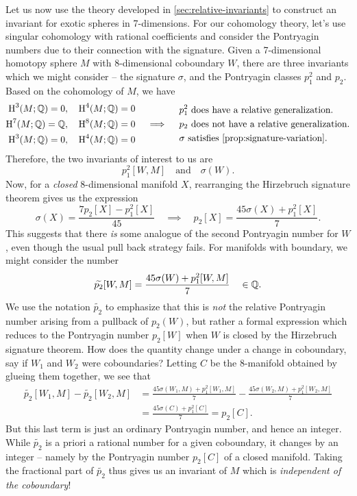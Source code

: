 Let us now use the theory developed in \cref{sec:relative-invariants} to construct an invariant for exotic spheres in 7-dimensions. For our cohomology theory, let's use singular cohomology with rational coefficients and consider the Pontryagin numbers due to their connection with the signature. 
Given a 7-dimensional homotopy sphere $M$ with 8-dimensional coboundary $W$, there are three invariants which we might consider -- the signature $\sigma$, and the Pontryagin classes $p_1^2$ and $p_2$.
Based on the cohomology of $M$, we have
\[
	\begin{aligned}
		\H^3(M; \Q)=0,  & \quad \H^4(M; \Q)=0 \\
		\H^7(M; \Q)=\Q, & \quad \H^8(M; \Q)=0 \\
		\H^3(M; \Q)=0,  & \quad \H^4(M; \Q)=0
	\end{aligned}
	\quad\implies\quad
	\begin{aligned}
		 & p_1^2\textrm{ does have a relative generalization.}         \\
		 & p_2\textrm{ does not have a relative generalization.}       \\
		 & \sigma\textrm{ satisfies \cref{prop:signature-variation}.}
	\end{aligned}
\]
Therefore, the two invariants of interest to us are
\[
	p_1^2[W,M]
	\quad\textrm{and}\quad
	\sigma(W).
\]
Now, for a \emph{closed} $8$-dimensional manifold $X$, rearranging the Hirzebruch signature theorem gives us the expression
\begin{equation}\label{eq:7-manifold_rearrangement}
	\sigma(X) = \frac{7p_2[X] - p_1^2[X]}{45}
	\quad\implies\quad
	p_2[X] = \frac{45\sigma(X) + p_1^2[X]}{7}.
\end{equation}
This suggests that there \emph{is} some analogue of the second Pontryagin number for $W$, even though the usual pull back strategy fails. For manifolds with boundary, we might consider the number
\[
	\widetilde{p_2}[W, M] = \frac{45\sigma(W) + p_1^2[W, M]}{7} \quad\in\mathbb{Q}.
\]
We use the notation $\widetilde{p_2}$ to emphasize that this is \emph{not} the relative Pontryagin number arising from a pullback of $p_2(W)$, but rather a formal expression which reduces to the Pontryagin number $p_2[W]$ when $W$ is closed by the Hirzebruch signature theorem.
How does the quantity change under a change in coboundary, say if $W_1$ and $W_2$ were coboundaries? Letting $C$ be the $8$-manifold obtained by glueing them together, we see that
\[
	\begin{aligned}
		\widetilde{p_2}[W_1,M] - \widetilde{p_2}[W_2,M]
		 & = \frac{45\sigma(W_1,M) + p_1^2[W_1,M]}{7} - \frac{45\sigma(W_2, M) + p_1^2[W_2,M]}{7} \\
		 & =\frac{45\sigma(C) + p_1^2[C]}{7} = p_2[C].
	\end{aligned}
\]
But this last term is just an ordinary Pontryagin number, and hence an integer. While $\widetilde{p_2}$ is a priori a rational number for a given coboundary, it changes by an integer -- namely by the Pontryagin number $p_2[C]$ of a closed manifold.
Taking the fractional part of $\widetilde{p_2}$ thus gives us an invariant of $M$ which is \emph{independent of the coboundary}! 

